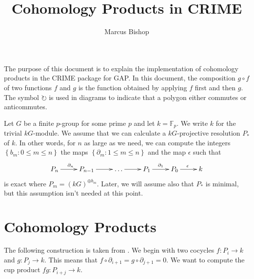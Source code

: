 \documentclass[12pt]{article}
\title{Cohomology Products in \textsf{CRIME}}
\author{Marcus Bishop}
\begin{document}
\maketitle
The purpose of this document is to explain
the implementation of cohomology products
in the \textsf{CRIME} package for \textsf{GAP}.
In this document, the composition $g\circ f$ of two functions
$f$ and $g$ is the function obtained by applying $f$ first 
and then $g$. The symbol $\circlearrowright$ is used
in diagrams to indicate that a polygon either commutes
or anticommutes. 

Let $G$ be a finite $p$-group for some prime $p$
and let $k=\mathbb{F}_p$. We write $k$ for the
trivial $kG$-module. We assume that we can
calculate a $kG$-projective resolution $P_\ast$
of $k$. In other words, for $n$ as large as we need,
we can compute the integers
$\left\{b_m:0\le m\le n\right\}$ the
maps $\left\{\partial_m:1\le m\le n\right\}$
and the map $\epsilon$ such that
\begin{equation}\label{proj}
\xymatrix{P_n\ar[r]^{\partial_n}
&P_{n-1}\ar[r]&\dots\ar[r]
&P_1\ar[r]^{\partial_1}
&P_0\ar[r]^{\epsilon}&k}\end{equation}
is exact where $P_m=\left(kG\right)^{\oplus b_m}$.
Later, we will assume also that $P_\ast$ is minimal,
but this assumption isn't needed at this point.

\section{Cohomology Products}\label{cp}
The following construction is taken from \cite{carlson}.
We begin with two cocycles $f:P_i\to k$ and $g:P_j\to k$.
This means that $f\circ\partial_{i+1}=g\circ\partial_{j+1}=0$.
We want to compute the cup product $fg:P_{i+j}\to k$.
\end{document}

